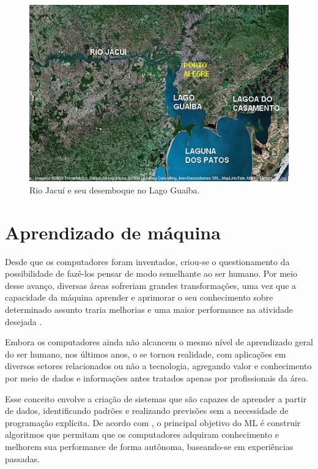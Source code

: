 \begin{figure}[H]
	\caption{\label{fig:bacia_guaiba_2}Rio Jacuí e seu desemboque no Lago Guaíba.}
	\begin{center}
		\includegraphics[scale=0.8]{figuras/lago_guaiba_2.jpg}
	\end{center}
\end{figure}

\section{Aprendizado de máquina}

Desde que os computadores foram inventados, criou-se o questionamento da possibilidade de fazê-los pensar de modo semelhante ao ser humano. Por meio desse avanço, diversas áreas sofreriam grandes transformações, uma vez que a capacidade da máquina aprender e aprimorar o seu conhecimento sobre determinado assunto traria melhorias e uma maior performance na atividade desejada \cite{carbonell1983}.

Embora os computadores ainda não alcancem o mesmo nível de aprendizado geral do ser humano, nos últimos anos, o  se tornou realidade, com aplicações em diversos setores relacionados ou não a tecnologia, agregando valor e conhecimento por meio de dados e informações antes tratados apenas por profissionais da área.

Esse conceito envolve a criação de sistemas que são capazes de aprender a partir de dados, identificando padrões e realizando previsões sem a necessidade de programação explícita. De acordo com \cite{carbonell1983}, o principal objetivo do \gls{ML} é construir algoritmos que permitam que os computadores adquiram conhecimento e melhorem sua performance de forma autônoma, baseando-se em experiências passadas.

